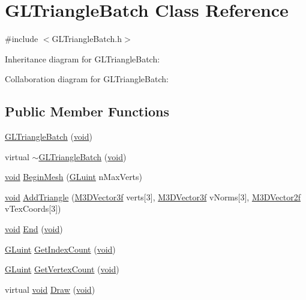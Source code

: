 \hypertarget{class_g_l_triangle_batch}{\section{G\-L\-Triangle\-Batch Class Reference}
\label{class_g_l_triangle_batch}
}


{\ttfamily \#include $<$G\-L\-Triangle\-Batch.\-h$>$}



Inheritance diagram for G\-L\-Triangle\-Batch\-:


Collaboration diagram for G\-L\-Triangle\-Batch\-:
\subsection*{Public Member Functions}
\begin{DoxyCompactItemize}
\item 
\hyperlink{class_g_l_triangle_batch_acb5f89624964d5bc88cc1824a5ab42ec}{G\-L\-Triangle\-Batch} (\hyperlink{_s_d_l__opengl_8h_a3db05964a3cc4410f35b7ea2b7eb850d}{void})
\item 
virtual \hyperlink{class_g_l_triangle_batch_aff5a65394a607da11b0521b72df1eb07}{$\sim$\-G\-L\-Triangle\-Batch} (\hyperlink{_s_d_l__opengl_8h_a3db05964a3cc4410f35b7ea2b7eb850d}{void})
\item 
\hyperlink{_s_d_l__opengl_8h_a3db05964a3cc4410f35b7ea2b7eb850d}{void} \hyperlink{class_g_l_triangle_batch_a990801751f6192f37214c9de4b8178d8}{Begin\-Mesh} (\hyperlink{_g_l_e_w_2glew_8h_a68c4714e43d8e827d80759f9cb864f3c}{G\-Luint} n\-Max\-Verts)
\item 
\hyperlink{_s_d_l__opengl_8h_a3db05964a3cc4410f35b7ea2b7eb850d}{void} \hyperlink{class_g_l_triangle_batch_a2c01c152092a320a4fcfe1ecb7ed4197}{Add\-Triangle} (\hyperlink{math3d_8h_a2163fe22bd4208b846d22ec7e74cf858}{M3\-D\-Vector3f} verts\mbox{[}3\mbox{]}, \hyperlink{math3d_8h_a2163fe22bd4208b846d22ec7e74cf858}{M3\-D\-Vector3f} v\-Norms\mbox{[}3\mbox{]}, \hyperlink{math3d_8h_a53c353d9bb3250cff53ebefe75cc8013}{M3\-D\-Vector2f} v\-Tex\-Coords\mbox{[}3\mbox{]})
\item 
\hyperlink{_s_d_l__opengl_8h_a3db05964a3cc4410f35b7ea2b7eb850d}{void} \hyperlink{class_g_l_triangle_batch_a11a43b24c53a5fd089d1b06f0847f15a}{End} (\hyperlink{_s_d_l__opengl_8h_a3db05964a3cc4410f35b7ea2b7eb850d}{void})
\item 
\hyperlink{_g_l_e_w_2glew_8h_a68c4714e43d8e827d80759f9cb864f3c}{G\-Luint} \hyperlink{class_g_l_triangle_batch_a93b01b75f18d52cc13c9e752a45d356c}{Get\-Index\-Count} (\hyperlink{_s_d_l__opengl_8h_a3db05964a3cc4410f35b7ea2b7eb850d}{void})
\item 
\hyperlink{_g_l_e_w_2glew_8h_a68c4714e43d8e827d80759f9cb864f3c}{G\-Luint} \hyperlink{class_g_l_triangle_batch_a77287aa52c1f30b0ce734bb773d72c6b}{Get\-Vertex\-Count} (\hyperlink{_s_d_l__opengl_8h_a3db05964a3cc4410f35b7ea2b7eb850d}{void})
\item 
virtual \hyperlink{_s_d_l__opengl_8h_a3db05964a3cc4410f35b7ea2b7eb850d}{void} \hyperlink{class_g_l_triangle_batch_a35becc895b7c347c4acc7c7176f1efa8}{Draw} (\hyperlink{_s_d_l__opengl_8h_a3db05964a3cc4410f35b7ea2b7eb850d}{void})
\end{DoxyCompactItemize}
